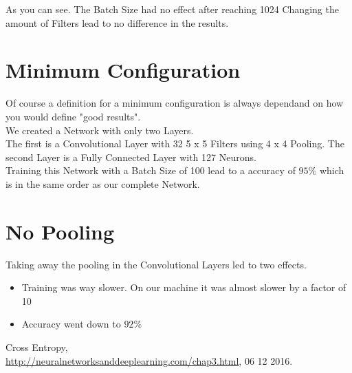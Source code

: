 \documentclass[twoside, twocolumn]{article}
\begin{document}
As you can see. The Batch Size had no effect after reaching 1024
Changing the amount of Filters lead to no difference in the results.


\section{Minimum Configuration}

Of course a definition for a minimum configuration is always dependand on how you would define "good results".\\
We created a Network with only two Layers.\\
The first is a Convolutional Layer with 32 5 x 5 Filters using 4 x 4 Pooling. The second Layer is a Fully Connected Layer with 127 Neurons.\\
Training this Network with a Batch Size of 100 lead to a accuracy of $95\%$ which is in the same order as our complete Network. 


\section{No Pooling}
Taking away the pooling in the Convolutional Layers led to two effects.\\
\begin{itemize}
	\item Training was way slower. On our machine it was almost slower by a factor of 10
	\item Accuracy went down to $92\%$
\end{itemize}


\begin{thebibliography}{99} %

Cross Entropy,\\ \url{http://neuralnetworksanddeeplearning.com/chap3.html}, 06 12 2016.
 
\end{thebibliography}

\end{document}
